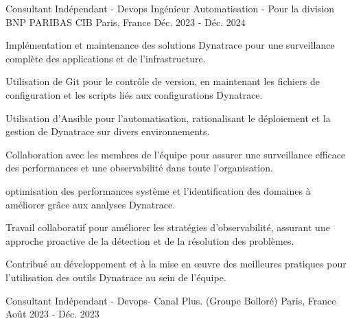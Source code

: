 

\begin{cventries}

  \cventry
    {Consultant Indépendant - Devops  Ingénieur Automatisation - }  %
    {Pour la division BNP PARIBAS CIB} %
    {Paris, France} %
    {Déc. 2023 - Déc. 2024} %
    {
      \begin{cvitems} %
        \item {Implémentation et maintenance des solutions Dynatrace pour une surveillance complète des applications et de l'infrastructure.}
        \item {Utilisation de Git pour le contrôle de version, en maintenant les fichiers de configuration et les scripts liés aux configurations Dynatrace.}
        \item {Utilisation d'Ansible pour l'automatisation, rationalisant le déploiement et la gestion de Dynatrace sur divers environnements.}
        \item {Collaboration avec les membres de l'équipe pour assurer une surveillance efficace des performances et une observabilité dans toute l'organisation.}
        \item {optimisation des performances système et l'identification des domaines à améliorer grâce aux analyses Dynatrace.}
        \item {Travail collaboratif pour améliorer les stratégies d'observabilité, assurant une approche proactive de la détection et de la résolution des problèmes.}
        \item {Contribué au développement et à la mise en œuvre des meilleures pratiques pour l'utilisation des outils Dynatrace au sein de l'équipe.}
      \end{cvitems}
    }
  \cventry
    {Consultant Indépendant - Devops- } %
    {Canal Plus. (Groupe Bolloré)} %
    {Paris, France} %
    {Août 2023 - Déc. 2023} %
    {
      \begin{cvitems} %

\end{cvitems}}
\end{cventries}
